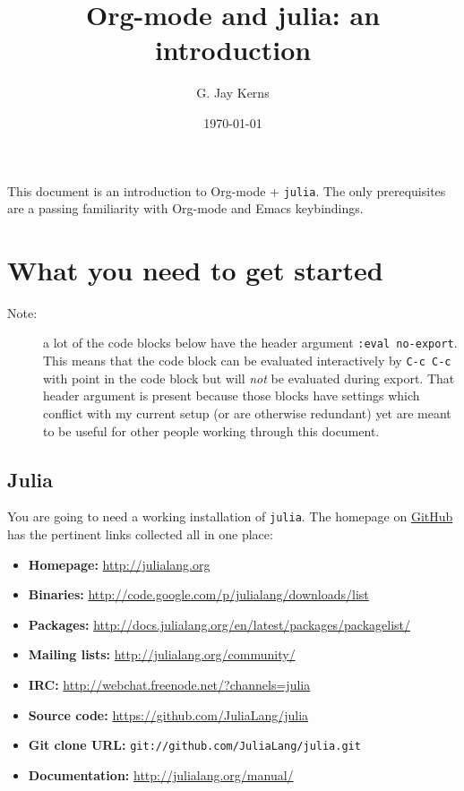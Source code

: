 \documentclass[11pt]{article}
\author{G. Jay Kerns}
\date{\today}
\title{Org-mode and julia: an introduction}
\begin{document}
\maketitle
\tableofcontents

This document is an introduction to Org-mode + \texttt{julia}. The only
prerequisites are a passing familiarity with Org-mode and Emacs
keybindings.

\newpage

\section[What you need to get started]{What you need to get started}
\label{sec-1}

\begin{description}
\item[Note:] a lot of the code blocks below have the header argument
\texttt{:eval no-export}.  This means that the code block can be
evaluated interactively by \texttt{C-c C-c} with point in the code
block but will \emph{not} be evaluated during export.  That
header argument is present because those blocks have
settings which conflict with my current setup (or are
otherwise redundant) yet are meant to be useful for other
people working through this document.
\end{description}

\subsection[Julia]{Julia}
\label{sec-1-1}

You are going to need a working installation of \texttt{julia}.  The homepage
on \href{https://github.com/JuliaLang/julia}{GitHub} has the pertinent links collected all in one place:

\begin{itemize}
\item \textbf{Homepage:} \url{http://julialang.org}
\item \textbf{Binaries:} \url{http://code.google.com/p/julialang/downloads/list}
\item \textbf{Packages:} \url{http://docs.julialang.org/en/latest/packages/packagelist/}
\item \textbf{Mailing lists:} \url{http://julialang.org/community/}
\item \textbf{IRC:} \url{http://webchat.freenode.net/?channels=julia}
\item \textbf{Source code:} \url{https://github.com/JuliaLang/julia}
\item \textbf{Git clone URL:} \texttt{git://github.com/JuliaLang/julia.git}
\item \textbf{Documentation:} \url{http://julialang.org/manual/}
\end{itemize}
\end{document}
